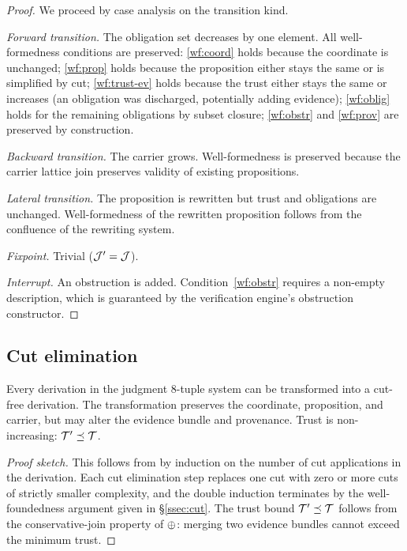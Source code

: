 \documentclass[11pt]{article}
\begin{document}
\begin{proof}
We proceed by case analysis on the transition kind.

\emph{Forward transition.}  The obligation set decreases by one element.
All well-formedness conditions are preserved: \ref{wf:coord} holds because
the coordinate is unchanged; \ref{wf:prop} holds because the proposition
either stays the same or is simplified by cut; \ref{wf:trust-ev} holds
because the trust either stays the same or increases (an obligation
was discharged, potentially adding evidence); \ref{wf:oblig} holds for
the remaining obligations by subset closure; \ref{wf:obstr} and \ref{wf:prov}
are preserved by construction.

\emph{Backward transition.}  The carrier grows.  Well-formedness is preserved
because the carrier lattice join preserves validity of existing propositions.

\emph{Lateral transition.}  The proposition is rewritten but trust and
obligations are unchanged.  Well-formedness of the rewritten proposition
follows from the confluence of the rewriting system.

\emph{Fixpoint.}  Trivial ($\mathcal{J}' = \mathcal{J}$).

\emph{Interrupt.}  An obstruction is added.  Condition~\ref{wf:obstr}
requires a non-empty description, which is guaranteed by the verification
engine's obstruction constructor.
\end{proof}

\subsection{Cut elimination}

\begin{theorem}\label{thm:cut-elim}
Every derivation in the judgment 8-tuple system can be transformed into
a cut-free derivation.  The transformation preserves the coordinate,
proposition, and carrier, but may alter the evidence bundle and provenance.
Trust is non-increasing: $\mathcal{T}' \preceq \mathcal{T}$.
\end{theorem}

\begin{proof}[Proof sketch]
This follows from  by induction on the number of cut
applications in the derivation.  Each cut elimination step replaces
one cut with zero or more cuts of strictly smaller complexity, and the
double induction terminates by the well-foundedness argument given in
\S\ref{ssec:cut}.  The trust bound $\mathcal{T}' \preceq \mathcal{T}$ follows from
the conservative-join property of $\oplus$: merging two evidence bundles
cannot exceed the minimum trust.
\end{proof}
\end{document}
